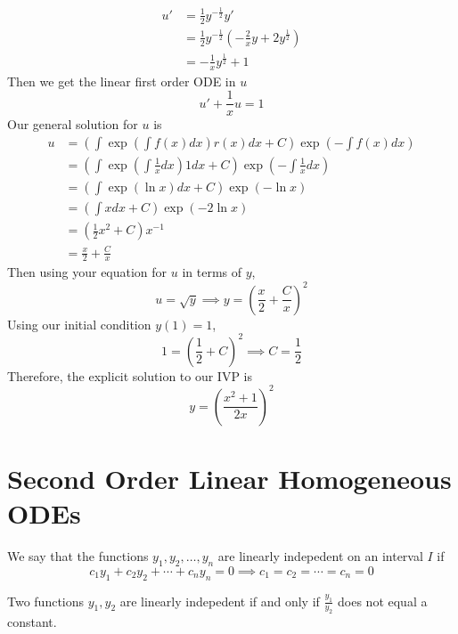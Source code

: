 \documentclass[openany]{report}
\begin{document}
\begin{align*}
    u' &= \frac{1}{2}y^{-\frac{1}{2}}y'\\
    &= \frac{1}{2}y^{-\frac{1}{2}}\left(-\frac{2}{x}y + 2y^{\frac{1}{2}}\right)\\
    &= -\frac{1}{x}y^{\frac{1}{2}} + 1
\end{align*} 
Then we get the linear first order ODE in $u$
\[u' + \frac{1}{x}u = 1\]
Our general solution for $u$ is 
\begin{align*}
    u &= \left(\int \exp\left(\int f(x)dx\right)r(x)dx + C\right)\exp\left(-\int f(x) dx\right)\\
    &= \left(\int \exp\left(\int\frac{1}{x}dx\right)1dx + C\right)\exp\left(-\int \frac{1}{x}dx\right)\\
    &= \left(\int \exp(\ln x)dx + C\right)\exp(-\ln x)\\
    &= \left(\int xdx + C\right)\exp(-2\ln x)\\
    &= \left(\frac{1}{2}x^2 + C\right)x^{-1}\\
    &= \frac{x}{2} + \frac{C}{x}
\end{align*}
Then using your equation for $u$ in terms of $y$, 
\[u = \sqrt{y} \implies y =\left(\frac{x}{2}+  \frac{C}{x}\right)^2\]
Using our initial condition $y(1) = 1$, 
\[1 = \left(\frac{1}{2} + C\right)^2 \implies C = \frac{1}{2}\]
Therefore, the explicit solution to our IVP is
\[y = \left(\frac{x^2 + 1}{2x}\right)^2\]
\chapter{Second Order Linear Homogeneous ODEs}
\begin{definition}
    We say that the functions $y_1, y_2, \ldots, y_n$ are linearly indepedent on an interval $I$ if 
    \[c_1y_1 + c_2y_2 + \cdots + c_ny_n = 0 \implies c_1 = c_2 = \cdots = c_n = 0\]
\end{definition}
\begin{theorem}
    Two functions $y_1,y_2$ are linearly indepedent if and only if $\frac{y_1}{y_2}$ does not equal a constant. 
\end{theorem}
\end{document}

